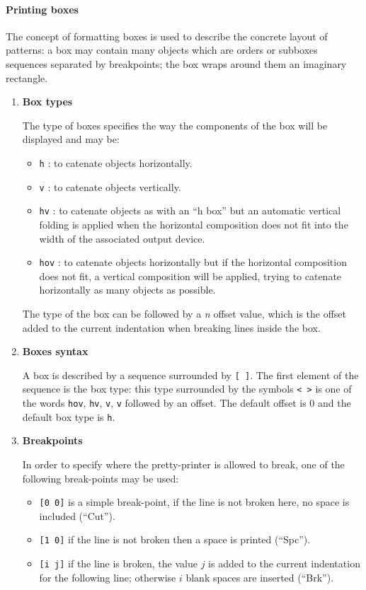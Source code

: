 \paragraph{Printing boxes}
The concept of formatting boxes is used to describe the concrete
layout of patterns: a box may contain many objects which are orders or
sub\-boxes sequences separated by break\-points; the box wraps around
them an imaginary rectangle.
\begin{enumerate}
\item {\bf Box types}

  The type of boxes specifies the way the components of the box will
  be displayed and may be:
\begin{itemize}
\item \verb+h+ : to catenate objects horizontally.
\item \verb+v+ : to catenate objects vertically.
\item \verb+hv+ : to catenate objects as with an ``h box'' but an
  automatic vertical folding is applied when the horizontal
  composition does not fit into the width of the associated output
  device.

\item \verb+hov+ : to catenate objects horizontally but if the
  horizontal composition does not fit, a vertical composition will be
  applied, trying to catenate horizontally as many objects as possible.
\end{itemize}

The type of the box can be followed by a {\it n} offset value, which
is the offset added to the current indentation when breaking lines
inside the box.


\item {\bf Boxes syntax}

  A box is described by a sequence surrounded by \verb+[ ]+. The first
  element of the sequence is the box type: this type surrounded by the
  symbols \verb+< >+ is one of the words \verb+hov+, \verb+hv+,
  \verb+v+, \verb+v+ followed by an offset. The default offset is 0
  and the default box type is \verb+h+.

\item {\bf Break\-points}

  In order to specify where the pretty-printer is allowed to break,
  one of the following break-points may be used:

\begin{itemize}
\item \verb+[0 0]+ is a simple break-point, if the line is not broken
  here, no space is included (``Cut'').
\item \verb+[1 0]+ if the line is not broken then a space is printed
  (``Spc'').
\item \verb+[i j]+ if the line is broken, the value $j$ is added to the
  current indentation for the following line; otherwise $i$ blank spaces
  are inserted (``Brk'').
\end{itemize}


\end{enumerate}
